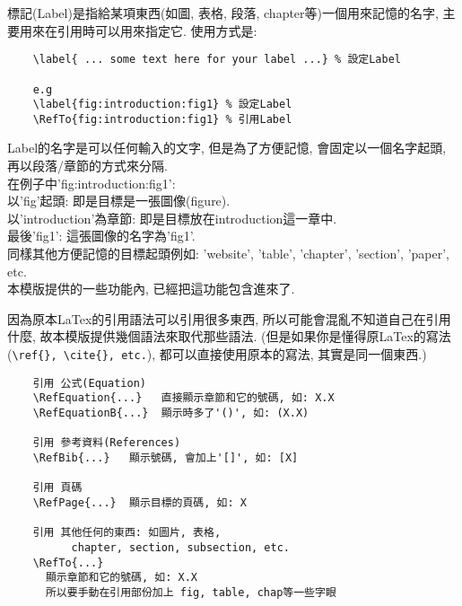 標記(Label)是指給某項東西(如圖, 表格, 段落, chapter等)一個用來記憶的名字, 主要用來在引用時可以用來指定它. 使用方式是:

  \EmptyLine
  \begin{fmpage}{\textwidth}
  \begin{verbatim}
    \label{ ... some text here for your label ...} % 設定Label

    e.g
    \label{fig:introduction:fig1} % 設定Label
    \RefTo{fig:introduction:fig1} % 引用Label
  \end{verbatim}
  \end{fmpage}
  \EmptyLine

\noindent Label的名字是可以任何輸入的文字, 但是為了方便記憶, 會固定以一個名字起頭, 再以段落/章節的方式來分隔.\\

\noindent 在例子中'fig:introduction:fig1':\\
以'fig'起頭: 即是目標是一張圖像(figure).\\
以'introduction'為章節: 即是目標放在introduction這一章中.\\
最後'fig1': 這張圖像的名字為'fig1'.\\

\noindent 同樣其他方便記憶的目標起頭例如: 'website', 'table', 'chapter', 'section', 'paper', etc.\\

\noindent 本模版提供的一些功能內, 已經把這功能包含進來了.

\newpage
{}
因為原本LaTex的引用語法可以引用很多東西, 所以可能會混亂不知道自己在引用什麼, 故本模版提供幾個語法來取代那些語法. (但是如果你是懂得原LaTex的寫法(\verb|\ref{}, \cite{}, etc.|), 都可以直接使用原本的寫法, 其實是同一個東西.)

  \EmptyLine
  \begin{fmpage}{\textwidth}
  \begin{verbatim}
    引用 公式(Equation)
    \RefEquation{...}   直接顯示章節和它的號碼, 如: X.X
    \RefEquationB{...}  顯示時多了'()', 如: (X.X)

    引用 參考資料(References)
    \RefBib{...}   顯示號碼, 會加上'[]', 如: [X]

    引用 頁碼
    \RefPage{...}  顯示目標的頁碼, 如: X

    引用 其他任何的東西: 如圖片, 表格,
          chapter, section, subsection, etc.
    \RefTo{...}
      顯示章節和它的號碼, 如: X.X
      所以要手動在引用部份加上 fig, table, chap等一些字眼
  \end{verbatim}
  \end{fmpage}

